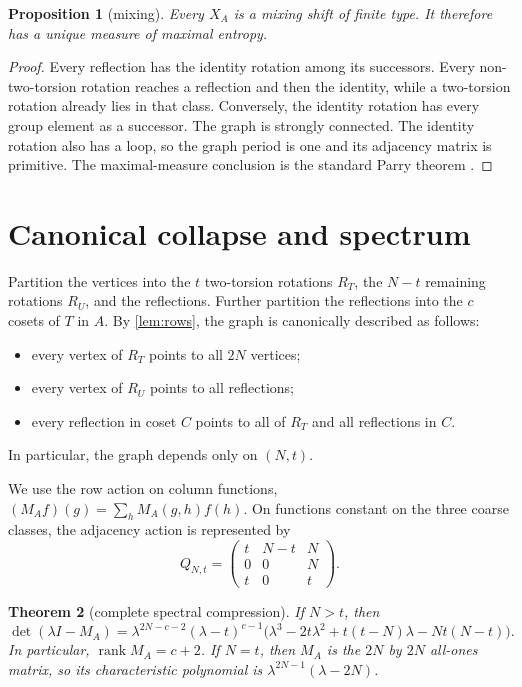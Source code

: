 \documentclass[11pt,a4paper]{amsart}
\newtheorem{theorem}{Theorem}[section]
\newtheorem{proposition}[theorem]{Proposition}
\theoremstyle{definition}
\theoremstyle{remark}
\begin{document}
\begin{proposition}[mixing]\label{prop:mixing}
Every $X_A$ is a mixing shift of finite type.  It therefore has a unique
measure of maximal entropy.
\end{proposition}

\begin{proof}
Every reflection has the identity rotation among its successors.  Every
non-two-torsion rotation reaches a reflection and then the identity, while a
two-torsion rotation already lies in that class.  Conversely, the identity
rotation has every group element as a successor.  The graph is strongly
connected.  The identity rotation also has a loop, so the graph period is one
and its adjacency matrix is primitive.  The maximal-measure conclusion is
the standard Parry theorem \cite{Parry1964}.
\end{proof}

\section{Canonical collapse and spectrum}

Partition the vertices into the $t$ two-torsion rotations $R_T$, the
$N-t$ remaining rotations $R_U$, and the reflections.  Further partition the
reflections into the $c$ cosets of $T$ in $A$.  By \cref{lem:rows}, the graph
is canonically described as follows:
\begin{itemize}
\item every vertex of $R_T$ points to all $2N$ vertices;
\item every vertex of $R_U$ points to all reflections;
\item every reflection in coset $C$ points to all of $R_T$ and all
reflections in $C$.
\end{itemize}
In particular, the graph depends only on $(N,t)$.

We use the row action on column functions,
$(M_Af)(g)=\sum_hM_A(g,h)f(h)$.  On functions constant on the three coarse
classes, the adjacency action is represented by
\begin{equation}\label{eq:Q}
 Q_{N,t}=
 \begin{pmatrix}
  t&N-t&N\\
  0&0&N\\
  t&0&t
 \end{pmatrix}.
\end{equation}

\begin{theorem}[complete spectral compression]\label{thm:spectrum}
If $N>t$, then
\begin{equation}\label{eq:charpoly}
 \det(\lambda I-M_A)
 =\lambda^{2N-c-2}(\lambda-t)^{c-1}
 \bigl(\lambda^3-2t\lambda^2+t(t-N)\lambda-Nt(N-t)\bigr).
\end{equation}
In particular, $\operatorname{rank}M_A=c+2$.  If $N=t$, then $M_A$ is the
$2N$ by $2N$ all-ones matrix, so its characteristic polynomial is
$\lambda^{2N-1}(\lambda-2N)$.
\end{theorem}
\end{document}
